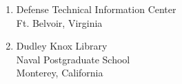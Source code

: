 \documentclass[twoside,dissertation,fivemembers,advisoralone]{npsreport}
\begin{document}
%
\begin{enumerate}
\itemsep \baselineskip %
\item Defense Technical Information Center\\Ft. Belvoir, Virginia
\item Dudley Knox Library\\Naval Postgraduate School\\Monterey, California
%
%
%
\end{enumerate}
\end{document}
